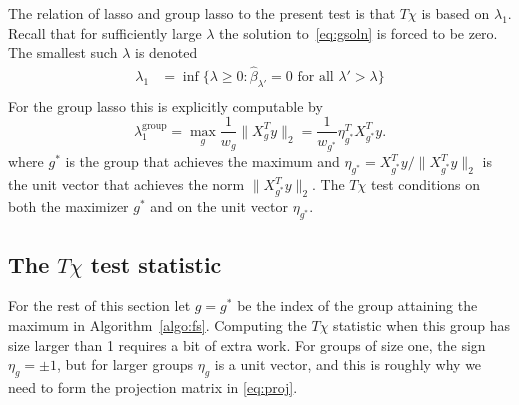 \documentclass[oupdraft]{bio}
\begin{document}
The relation of lasso and group lasso to the present test is that
$T\chi$ is based on $\lambda_1$. Recall that
for sufficiently large $\lambda$ the solution to~\eqref{eq:gsoln} is forced
to be zero. The smallest such $\lambda$ is denoted
\begin{equation}
  \begin{aligned}
   \lambda_1 &= \inf \{ \lambda \geq 0 : \hat \beta_{\lambda'} = 0 \text{ for all } \lambda' > \lambda \} \\
  \end{aligned}
\end{equation}
For the group lasso this is explicitly computable by
\begin{equation}
\lambda_1^{\text{group}} = \max_{g} \frac{1}{w_g}\|X_g^Ty\|_2
 = \frac{1}{w_{g^*}}\eta_{g^*}^TX_{g^*}^Ty .
\end{equation}
where $g^*$ is the group that achieves the maximum and
$\eta_{g^*} = X_{g^*}^Ty / \|X_{g^*}^Ty\|_2$ is the unit vector that
achieves the norm $\|X_{g^*}^Ty\|_2$. 
The $T\chi$ test conditions on both the maximizer $g^*$ and
on the unit vector $\eta_{g^*}$.

\subsection{The $T\chi$ test statistic}

For the rest of this section let $g = g^*$ be the index of the group attaining the maximum in Algorithm~\ref{algo:fs}. Computing the $T\chi$ statistic when this group has size larger than 1 requires a bit of extra work. For groups of size one, the sign $\eta_g = \pm 1$, but for larger groups $\eta_g$ is a unit vector, and this is roughly why we need to form the projection matrix in \eqref{eq:proj}.
\end{document}
